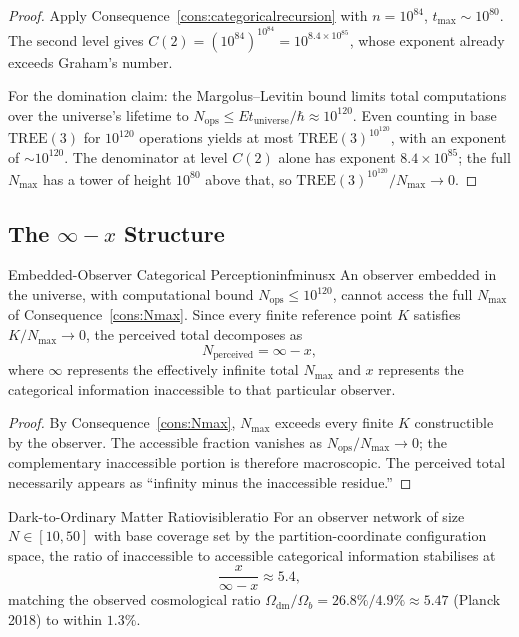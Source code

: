 \begin{proof}
Apply Consequence~\ref{cons:categoricalrecursion} with $n = 10^{84}$,
$t_{\max} \sim 10^{80}$.
The second level gives
$C(2) = (10^{84})^{10^{84}} = 10^{8.4\times10^{85}}$,
whose exponent already exceeds Graham's number.

For the domination claim: the Margolus--Levitin bound limits total computations
over the universe's lifetime to
$N_{\mathrm{ops}} \leq Et_{\mathrm{universe}}/\hbar \approx 10^{120}$.
Even counting in base $\mathrm{TREE}(3)$ for $10^{120}$ operations yields at
most $\mathrm{TREE}(3)^{10^{120}}$, with an exponent of $\sim 10^{120}$.
The denominator at level $C(2)$ alone has exponent $8.4\times10^{85}$; the
full $N_{\max}$ has a tower of height $10^{80}$ above that, so
$\mathrm{TREE}(3)^{10^{120}}/N_{\max} \to 0$.
\end{proof}

\subsection{The $\infty - x$ Structure}

\begin{consequence}{Embedded-Observer Categorical Perception}{infminusx}
  An observer embedded in the universe, with computational bound
  $N_{\mathrm{ops}} \leq 10^{120}$, cannot access the full $N_{\max}$ of
  Consequence~\ref{cons:Nmax}.
  Since every finite reference point $K$ satisfies $K/N_{\max} \to 0$, the
  perceived total decomposes as
  \begin{equation}
    N_{\mathrm{perceived}} = \infty - x,
  \end{equation}
  where $\infty$ represents the effectively infinite total $N_{\max}$ and $x$
  represents the categorical information inaccessible to that particular
  observer.
\end{consequence}

\begin{proof}
By Consequence~\ref{cons:Nmax}, $N_{\max}$ exceeds every finite $K$
constructible by the observer.
The accessible fraction vanishes as $N_{\mathrm{ops}}/N_{\max} \to 0$; the
complementary inaccessible portion is therefore macroscopic.
The perceived total necessarily appears as ``infinity minus the inaccessible
residue.''
\end{proof}

\begin{consequence}{Dark-to-Ordinary Matter Ratio}{visibleratio}
  For an observer network of size $N \in [10, 50]$ with base coverage set by
  the partition-coordinate configuration space, the ratio of inaccessible to
  accessible categorical information stabilises at
  \begin{equation}\label{eq:visibleratio}
    \frac{x}{\infty - x} \approx 5.4,
  \end{equation}
  matching the observed cosmological ratio
  $\Omega_{\mathrm{dm}}/\Omega_{b} = 26.8\%/4.9\% \approx 5.47$ (Planck 2018)
  to within $1.3\%$.
\end{consequence}

